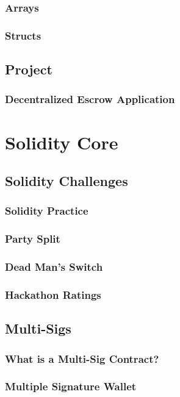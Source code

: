 \documentclass[a4paper, oneside]{book}
\begin{document}
\subsection{Arrays}
\subsection{Structs}

\section{Project}
\subsection{Decentralized Escrow Application}

\chapter{Solidity Core}

\section{Solidity Challenges}
\subsection{Solidity Practice}
\subsection{Party Split}
\subsection{Dead Man's Switch}
\subsection{Hackathon Ratings}

\section{Multi-Sigs}
\subsection{What is a Multi-Sig Contract?}
\subsection{Multiple Signature Wallet}
\end{document}
